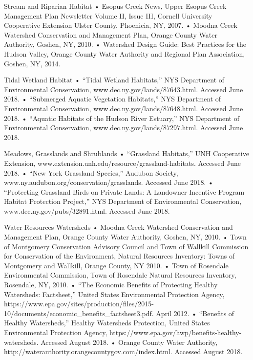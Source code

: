Stream and Riparian Habitat
    • Esopus Creek News, Upper Esopus Creek Management Plan Newsletter Volume II, Issue III, Cornell University Cooperative Extension Ulster County, Phoenicia, NY, 2007.
    • Moodna Creek Watershed Conservation and Management Plan, Orange County Water Authority, Goshen, NY, 2010.
    • Watershed Design Guide: Best Practices for the Hudson Valley, Orange County Water Authority and Regional Plan Association, Goshen, NY, 2014.

Tidal Wetland Habitat
    • “Tidal Wetland Habitats,” NYS Department of Environmental Conservation, www.dec.ny.gov/lands/87643.html. Accessed June 2018.
    • “Submerged Aquatic Vegetation Habitats,” NYS Department of Environmental Conservation, www.dec.ny.gov/lands/87648.html. Accessed June 2018.
    • “Aquatic Habitats of the Hudson River Estuary,” NYS Department of Environmental Conservation, www.dec.ny.gov/lands/87297.html. Accessed June 2018.

Meadows, Grasslands and Shrublands
    • “Grassland Habitats,” UNH Cooperative Extension, www.extension.unh.edu/resource/grassland-habitats. Accessed June 2018.
    • “New York Grassland Species,” Audubon Society, www.ny.audubon.org/conservation/grasslands. Accessed June 2018.
    • “Protecting Grassland Birds on Private Lands: A Landowner Incentive Program Habitat Protection Project,” NYS Department of Environmental Conservation, www.dec.ny.gov/pubs/32891.html. Accessed June 2018.


Water Resources
Watersheds
    • Moodna Creek Watershed Conservation and Management Plan, Orange County Water Authority, Goshen, NY, 2010.
    • Town of Montgomery Conservation Advisory Council and Town of Wallkill Commission for Conservation of the Environment, Natural Resources Inventory: Towns of Montgomery and Wallkill, Orange County, NY 2010.
    • Town of Rosendale Environmental Commission, Town of Rosendale Natural Resources Inventory, Rosendale, NY, 2010.
    • “The Economic Benefits of Protecting Healthy Watersheds: Factsheet,” United States Environmental Protection Agency, https://www.epa.gov/sites/production/files/2015-10/documents/economic_benefits_factsheet3.pdf. April 2012.
    • “Benefits of Healthy Watersheds,” Healthy Watersheds Protection, United States Environmental Protection Agency, https://www.epa.gov/hwp/benefits-healthy-watersheds. Accessed August 2018.
    • Orange County Water Authority, http://waterauthority.orangecountygov.com/index.html. Accessed August 2018.

